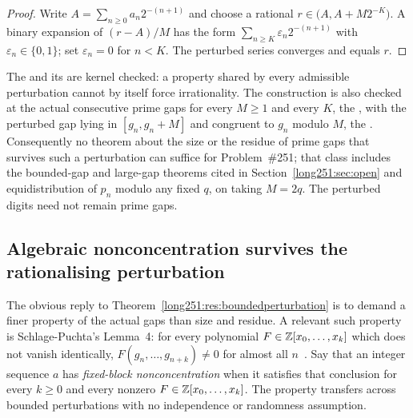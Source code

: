 \documentclass[11pt]{article}
\begin{document}
\begin{proof}
Write $A=\sum_{n\ge0}a_n2^{-(n+1)}$ and choose a rational
$r\in\bigl(A,A+M2^{-K}\bigr)$.  A binary expansion of $(r-A)/M$ has the form
$\sum_{n\ge K}\varepsilon_n2^{-(n+1)}$ with $\varepsilon_n\in\{0,1\}$; set
$\varepsilon_n=0$ for $n<K$.  The perturbed series converges and equals $r$.
\end{proof}

\noindent The
and its
 are kernel checked: a property shared by every admissible
perturbation cannot by itself force irrationality.  The construction is also
checked at the actual consecutive prime gaps for every $M\ge1$ and every $K$,
the
, with the perturbed gap lying in $[g_n,g_n+M]$ and
congruent to $g_n$ modulo $M$, the
.  Consequently no theorem about the size or the residue of prime gaps
that survives such a perturbation can suffice for Problem~\#251; that class
includes the bounded-gap and large-gap theorems cited in
Section~\ref{long251:sec:open} and equidistribution of $p_n$ modulo any fixed $q$, on
taking $M=2q$.  The perturbed digits need not remain prime gaps.

\subsection{Algebraic nonconcentration survives the rationalising perturbation}

The obvious reply to Theorem~\ref{long251:res:boundedperturbation} is to demand a
finer property of the actual gaps than size and residue.  A relevant such
property is Schlage-Puchta's Lemma~4: for every polynomial
$F\in\mathbb{Z}[x_0,\ldots,x_k]$ which does not vanish identically,
$F(g_n,\ldots,g_{n+k})\ne0$ for almost all $n$~\cite[Lemma~4,
pp.~5--6]{schlagepuchta2011}.  Say that an integer sequence $a$ has
\emph{fixed-block nonconcentration} when it satisfies that conclusion for
every $k\ge0$ and every nonzero $F\in\mathbb{Z}[x_0,\ldots,x_k]$.  The property
transfers across bounded perturbations with no independence or randomness
assumption.
\end{document}
